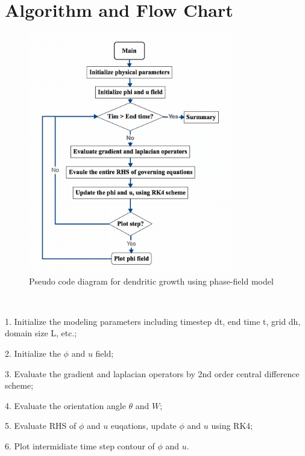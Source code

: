 \documentclass{article}
\begin{document}
\section{Algorithm and Flow Chart}
\begin{figure}[htb!]
\begin{center}
\includegraphics[width=0.8\textwidth]{flowchart_v_1} %
\caption{Pseudo code diagram for dendritic growth using phase-field model}
\end{center}
\end{figure}
\par \ 
\par 1. Initialize the modeling parameters including timestep dt, end time t, grid dh, domain size L, etc.;
\par 2. Initialize the $\phi$ and $u$ field;
\par 3. Evaluate the gradient and laplacian operators by 2nd order central difference scheme; 
\par 4. Evaluate the orientation angle $\theta$ and $W$;
\par 5. Evaluate RHS of $\phi$ and $u$ euqations, update $\phi$ and $u$ using RK4;
\par 6. Plot intermidiate time step contour of $\phi$ and $u$.
\end{document}
